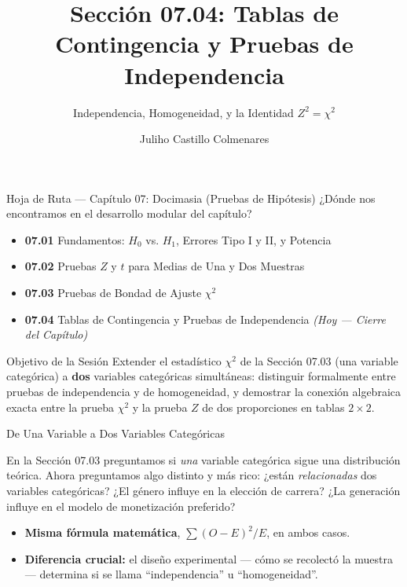 \documentclass[10pt, aspectratio=169]{beamer}
\title[Contingencia e Independencia]{Sección 07.04: Tablas de Contingencia y Pruebas de Independencia}
\subtitle{Independencia, Homogeneidad, y la Identidad $Z^2=\chi^2$}
\author[J. Castillo Colmenares]{Juliho Castillo Colmenares}
\institute{Tecnológico de Monterrey}
\date{\vspace{-1.2cm}}
\begin{document}
\begin{frame}[plain]
  \vspace{-0.8cm}
  \titlepage
\end{frame}

\begin{frame}{Hoja de Ruta --- Capítulo 07: Docimasia (Pruebas de Hipótesis)}
  \footnotesize
  ¿Dónde nos encontramos en el desarrollo modular del capítulo? \pause
  \begin{itemize}\itemsep=0.08em
    \item \textbf{07.01} Fundamentos: $H_0$ vs. $H_1$, Errores Tipo I y II, y Potencia \pause
    \item \textbf{07.02} Pruebas $Z$ y $t$ para Medias de Una y Dos Muestras \pause
    \item \textbf{07.03} Pruebas de Bondad de Ajuste $\chi^2$ \pause
    \item \textbf{07.04} Tablas de Contingencia y Pruebas de Independencia \emph{(Hoy --- Cierre del Capítulo)}
  \end{itemize}
  \vspace{-0.05cm}
  \begin{block}{Objetivo de la Sesión}
    Extender el estadístico $\chi^2$ de la Sección 07.03 (una variable categórica) a \textbf{dos} variables categóricas simultáneas: distinguir formalmente entre pruebas de independencia y de homogeneidad, y demostrar la conexión algebraica exacta entre la prueba $\chi^2$ y la prueba $Z$ de dos proporciones en tablas $2\times2$.
  \end{block}
\end{frame}

\begin{frame}{De Una Variable a Dos Variables Categóricas}
  \footnotesize
  \begin{motivacion}
    En la Sección 07.03 preguntamos si \emph{una} variable categórica sigue una distribución teórica. Ahora preguntamos algo distinto y más rico: ¿están \emph{relacionadas} dos variables categóricas? ¿El género influye en la elección de carrera? ¿La generación influye en el modelo de monetización preferido?
  \end{motivacion}

  \vspace{0.15cm}
  \pause
  \begin{itemize}\itemsep=0.1cm
    \item \textbf{Misma fórmula matemática}, $\sum(O-E)^2/E$, en ambos casos. \pause
    \item \textbf{Diferencia crucial:} el diseño experimental --- cómo se recolectó la muestra --- determina si se llama ``independencia'' u ``homogeneidad''.
  \end{itemize}
\end{frame}
\end{document}
